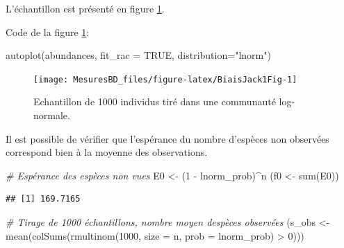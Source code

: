 \documentclass[
  11pt,
  american,
  a4paper,
  extrafontsizes,onecolumn,openright
  ]{memoir}
\newenvironment{Shaded}{\begin{snugshade}}{\end{snugshade}}
\newcommand{\AttributeTok}[1]{\textcolor[rgb]{0.77,0.63,0.00}{#1}}
\newcommand{\CommentTok}[1]{\textcolor[rgb]{0.56,0.35,0.01}{\textit{#1}}}
\newcommand{\ConstantTok}[1]{\textcolor[rgb]{0.00,0.00,0.00}{#1}}
\newcommand{\DecValTok}[1]{\textcolor[rgb]{0.00,0.00,0.81}{#1}}
\newcommand{\FunctionTok}[1]{\textcolor[rgb]{0.00,0.00,0.00}{#1}}
\newcommand{\NormalTok}[1]{#1}
\newcommand{\OtherTok}[1]{\textcolor[rgb]{0.56,0.35,0.01}{#1}}
\newcommand{\SpecialCharTok}[1]{\textcolor[rgb]{0.00,0.00,0.00}{#1}}
\newcommand{\StringTok}[1]{\textcolor[rgb]{0.31,0.60,0.02}{#1}}
\begin{document}
\normalsize

L'échantillon est présenté en figure \ref{fig:BiaisJack1Fig}.

Code de la figure \ref{fig:BiaisJack1Fig}:

\scriptsize

\begin{Shaded}
\begin{Highlighting}[]
\FunctionTok{autoplot}\NormalTok{(abundances, }\AttributeTok{fit\_rac =} \ConstantTok{TRUE}\NormalTok{, }\AttributeTok{distribution=}\StringTok{"lnorm"}\NormalTok{)}
\end{Highlighting}
\end{Shaded}

\normalsize

\scriptsize

\begin{figure}

{\centering \texttt{[image: MesuresBD\_files/figure-latex/BiaisJack1Fig-1]} 

}

\caption{Echantillon de 1000 individus tiré dans une communauté log-normale.}\label{fig:BiaisJack1Fig}
\end{figure}

\normalsize

Il est possible de vérifier que l'espérance du nombre d'espèces non observées correspond bien à la moyenne des observations.

\scriptsize

\begin{Shaded}
\begin{Highlighting}[]
\CommentTok{\# Espérance des espèces non vues}
\NormalTok{E0 }\OtherTok{\textless{}{-}}\NormalTok{ (}\DecValTok{1} \SpecialCharTok{{-}}\NormalTok{ lnorm\_prob)}\SpecialCharTok{\^{}}\NormalTok{n}
\NormalTok{(f0 }\OtherTok{\textless{}{-}} \FunctionTok{sum}\NormalTok{(E0))}
\end{Highlighting}
\end{Shaded}

\begin{verbatim}
## [1] 169.7165
\end{verbatim}

\begin{Shaded}
\begin{Highlighting}[]
\CommentTok{\# Tirage de 1000 échantillons, nombre moyen d\textquotesingle{}espèces observées}
\NormalTok{(s\_obs }\OtherTok{\textless{}{-}} \FunctionTok{mean}\NormalTok{(}\FunctionTok{colSums}\NormalTok{(}\FunctionTok{rmultinom}\NormalTok{(}\DecValTok{1000}\NormalTok{, }\AttributeTok{size =}\NormalTok{ n, }\AttributeTok{prob =}\NormalTok{ lnorm\_prob) }\SpecialCharTok{\textgreater{}} \DecValTok{0}\NormalTok{)))}
\end{Highlighting}
\end{Shaded}
\end{document}
